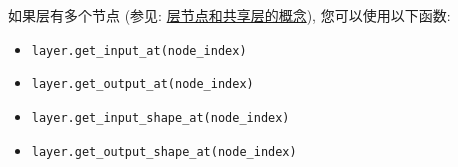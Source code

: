 如果层有多个节点 (参见:
\hyperref[the-concept-of-layer-node]{层节点和共享层的概念}),
您可以使用以下函数:

\begin{itemize}
\tightlist
\item
  \texttt{layer.get\_input\_at(node\_index)}
\item
  \texttt{layer.get\_output\_at(node\_index)}
\item
  \texttt{layer.get\_input\_shape\_at(node\_index)}
\item
  \texttt{layer.get\_output\_shape\_at(node\_index)}
\end{itemize}
\newpage
